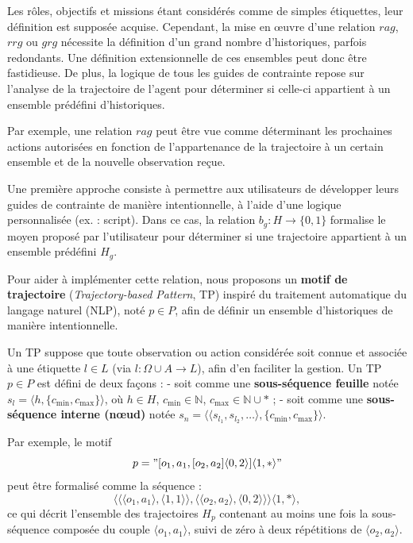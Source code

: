 \documentclass[pdflatex,sn-mathphys-num]{sn-jnl}%
\theoremstyle{thmstyleone}%
\theoremstyle{thmstyletwo}%
\theoremstyle{thmstylethree}%
\begin{document}
Les rôles, objectifs et missions étant considérés comme de simples étiquettes, leur définition est supposée acquise. Cependant, la mise en œuvre d'une relation $rag$, $rrg$ ou $grg$ nécessite la définition d'un grand nombre d'historiques, parfois redondants. Une définition extensionnelle de ces ensembles peut donc être fastidieuse. De plus, la logique de tous les guides de contrainte repose sur l'analyse de la trajectoire de l'agent pour déterminer si celle-ci appartient à un ensemble prédéfini d'historiques.

Par exemple, une relation $rag$ peut être vue comme déterminant les prochaines actions autorisées en fonction de l'appartenance de la trajectoire à un certain ensemble et de la nouvelle observation reçue.

Une première approche consiste à permettre aux utilisateurs de développer leurs guides de contrainte de manière intentionnelle, à l'aide d'une logique personnalisée (ex. : script). Dans ce cas, la relation $b_g: H \to \{0,1\}$ formalise le moyen proposé par l'utilisateur pour déterminer si une trajectoire appartient à un ensemble prédéfini $H_g$.

Pour aider à implémenter cette relation, nous proposons un \textbf{motif de trajectoire} (\textit{Trajectory-based Pattern}, TP) inspiré du traitement automatique du langage naturel (NLP), noté $p \in P$, afin de définir un ensemble d'historiques de manière intentionnelle.

Un TP suppose que toute observation ou action considérée soit connue et associée à une étiquette $l \in L$ (via $l: \Omega \cup A \to L$), afin d'en faciliter la gestion. Un TP $p \in P$ est défini de deux façons :
- soit comme une \textbf{sous-séquence feuille} notée $s_l = \langle h, \{c_{\text{min}}, c_{\text{max}}\} \rangle$, où $h \in H$, $c_{\text{min}} \in \mathbb{N}$, $c_{\text{max}} \in \mathbb{N} \cup *$ ;
- soit comme une \textbf{sous-séquence interne (nœud)} notée $s_n = \langle \langle s_{l_1}, s_{l_2}, \dots \rangle, \{c_{\text{min}}, c_{\text{max}}\} \rangle$.

Par exemple, le motif 
\[
    p = "[o_1,a_1,[o_2,a_2]\langle0,2\rangle]\langle1,*\rangle"
\]
peut être formalisé comme la séquence :
\[
    \langle \langle \langle o_1,a_1 \rangle, \langle 1,1 \rangle \rangle, \langle \langle o_2,a_2 \rangle, \langle 0,2 \rangle \rangle \rangle \langle 1,* \rangle,
\]
ce qui décrit l'ensemble des trajectoires $H_p$ contenant au moins une fois la sous-séquence composée du couple $\langle o_1, a_1 \rangle$, suivi de zéro à deux répétitions de $\langle o_2, a_2 \rangle$.
\end{document}
